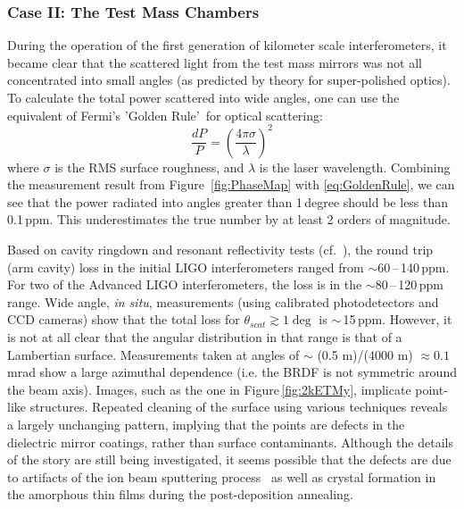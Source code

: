 \subsubsection{Case II: The Test Mass Chambers}
During the operation of the first generation of kilometer scale interferometers,
it became clear that the scattered light from the test mass mirrors was not
all concentrated into small angles (as predicted by theory for super-polished
optics). To calculate the total power scattered into wide angles, one can use the
equivalent of Fermi's 'Golden Rule'\,\cite{Weiss:Scatter97} for optical scattering:
\begin{equation}
\frac{dP}{P} = \left( \frac{4 \pi \sigma}{\lambda} \right)^2
\label{eq:GoldenRule}
\end{equation}
where $\sigma$ is the RMS surface roughness, and $\lambda$ is the
laser wavelength. Combining the measurement result from
Figure~\ref{fig:PhaseMap} with \eqref{eq:GoldenRule}, we can see that the power radiated into
angles greater than 1\,degree should be
less than 0.1\,ppm. This underestimates the true number by
at least 2 orders of magnitude.

Based on cavity ringdown and resonant reflectivity tests 
(cf.~\cite{Isogai2013}), the round trip (arm cavity) loss in the
 initial LIGO interferometers ranged from
$\sim$60\,--\,140\,ppm. For two of the Advanced LIGO interferometers, the loss
is in the $\sim$80\,--\,120\,ppm range. Wide angle, \textit{in situ},
measurements (using calibrated photodetectors and CCD cameras) show
that the total loss for $\theta_{scat} \gtrsim 1\deg$ is $\sim$\,15\,ppm.
However, it is not at all clear that the angular distribution in that
range is that of a Lambertian surface. Measurements taken at angles of
$\sim$ (0.5 m)/(4000 m) $\approx 0.1$\,mrad show a large azimuthal dependence
(i.e. the BRDF is not symmetric around the beam axis).
Images, such as the one in Figure\,\ref{fig:2kETMy}, 
implicate point-like structures.
Repeated cleaning of the surface using various techniques reveals a largely
unchanging pattern, implying that the points are defects in the dielectric
mirror coatings, rather than surface contaminants. Although the details of the
story are still being investigated, it seems possible that the defects
are due to artifacts of the ion beam sputtering process~\cite{reid2016development} as well as
crystal formation in the amorphous thin films during the
post-deposition annealing.

